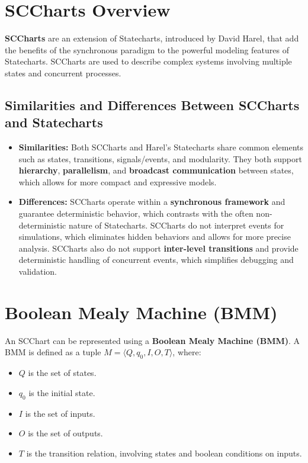 \documentclass[
  14pt,
  a4paper,
  numbers=noendperiod,
  headinclude=true,
  footinclude=true,
  DIV=calc]{scrreprt}
\begin{document}
\section{SCCharts Overview}\label{sccharts-overview}

\textbf{SCCharts} are an extension of Statecharts, introduced by David
Harel, that add the benefits of the synchronous paradigm to the powerful
modeling features of Statecharts. SCCharts are used to describe complex
systems involving multiple states and concurrent processes.

\subsection{Similarities and Differences Between SCCharts and
Statecharts}\label{similarities-and-differences-between-sccharts-and-statecharts}

\begin{itemize}
\item
  \textbf{Similarities:} Both SCCharts and Harel's Statecharts share
  common elements such as states, transitions, signals/events, and
  modularity. They both support \textbf{hierarchy},
  \textbf{parallelism}, and \textbf{broadcast communication} between
  states, which allows for more compact and expressive models.
\item
  \textbf{Differences:} SCCharts operate within a \textbf{synchronous
  framework} and guarantee deterministic behavior, which contrasts with
  the often non-deterministic nature of Statecharts. SCCharts do not
  interpret events for simulations, which eliminates hidden behaviors
  and allows for more precise analysis. SCCharts also do not support
  \textbf{inter-level transitions} and provide deterministic handling of
  concurrent events, which simplifies debugging and validation.
\end{itemize}

\section{Boolean Mealy Machine (BMM)}\label{boolean-mealy-machine-bmm}

An SCChart can be represented using a \textbf{Boolean Mealy Machine
(BMM)}. A BMM is defined as a tuple
\(M = \langle Q, q_0, I, O, T \rangle\), where:

\begin{itemize}
\item
  \(Q\) is the set of states.
\item
  \(q_0\) is the initial state.
\item
  \(I\) is the set of inputs.
\item
  \(O\) is the set of outputs.
\item
  \(T\) is the transition relation, involving states and boolean
  conditions on inputs.
\end{itemize}
\end{document}
